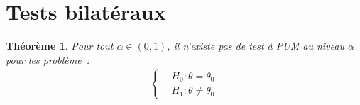 \documentclass{report}
\newtheorem{thm}{Théorème}[chapter]
\theoremstyle{definition}
\theoremstyle{remark}
\begin{document}
	\section{Tests bilatéraux}
		\begin{thm} Pour tout $\alpha \in (0, 1)$, il n'existe pas de test à PUM au niveau $\alpha$ pour les problème~:
		\begin{align}\label{eq:test_hyp_=_neq}
			\begin{cases}
				&H_0 : \theta = \theta_0 \\
				&H_1 : \theta \neq \theta_0
			\end{cases}
		\end{align}
		\end{thm}
\end{document}
